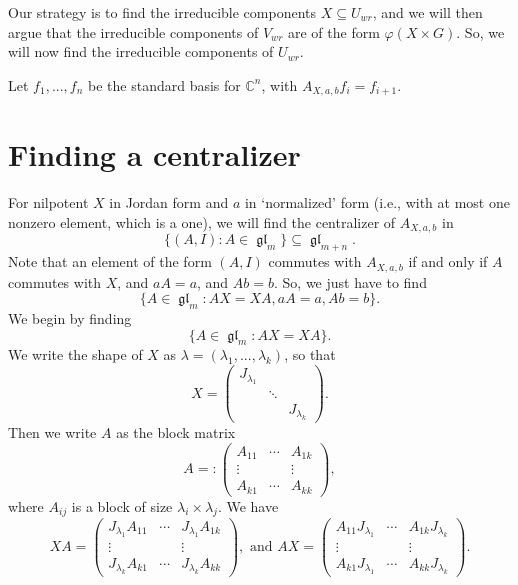 \documentclass[12pt,psamsfonts]{article}
\DeclareMathOperator{\gl}{\mathfrak{gl}}
\begin{document}
Our strategy is to find the irreducible components \(X \subseteq U_{wr}\), and we will then argue that the irreducible components of \(V_{wr}\) are of the form \(\varphi(X \times G)\).
So, we will now find the irreducible components of \(U_{wr}\).


Let \(f_1, ..., f_n\) be the standard basis for \(\mathbb{C}^n\), with \(A_{X, a, b} f_i = f_{i + 1}\).



\section{Finding a centralizer}
For nilpotent \(X\) in Jordan form and \(a\) in `normalized' form (i.e., with at most one nonzero element, which is a one), we will find the centralizer of \(A_{X, a, b}\) in 
\[\{(A, I) : A \in \gl_m\} \subseteq \gl_{m + n}.\]
Note that an element of the form \((A, I)\) commutes with \(A_{X, a, b}\) if and only if \(A\) commutes with \(X\), and \(aA = a\), and \(Ab = b\).
So, we just have to find 
\[\{A \in \gl_m : AX = XA, aA = a, Ab = b\}.\]
We begin by finding 
\[\{A \in \gl_m : AX = XA\}.\]
We write the shape of \(X\) as \(\lambda = (\lambda_1, ..., \lambda_k)\), so that 
\[X = \begin{pmatrix}
    J_{\lambda_1} & \\
    & \ddots \\
    & & J_{\lambda_k}
\end{pmatrix}.\]
Then we write \(A\) as the block matrix
\[A =: \begin{pmatrix}
    A_{11} & \cdots & A_{1k}\\
    \vdots & & \vdots\\
    A_{k1} & \cdots & A_{kk}
\end{pmatrix},\]
where \(A_{ij}\) is a block of size \(\lambda_i \times \lambda_j\).
We have 
\[XA = \begin{pmatrix}
    J_{\lambda_1}A_{11} & \cdots & J_{\lambda_1}A_{1k}\\
    \vdots & & \vdots\\
    J_{\lambda_k}A_{k1} & \cdots & J_{\lambda_k}A_{kk}
\end{pmatrix}, \textrm{ and } AX = \begin{pmatrix}
    A_{11} J_{\lambda_1} & \cdots & A_{1k} J_{\lambda_k}\\
    \vdots & & \vdots\\
    A_{k1} J_{\lambda_1} & \cdots & A_{kk} J_{\lambda_k}
\end{pmatrix}.\]
\end{document}
